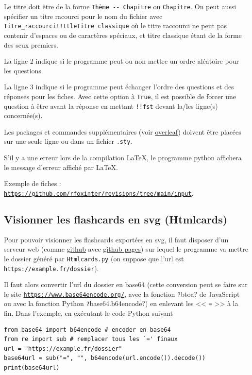 \documentclass[a4paper,12pt]{article}
\begin{document}
Le titre doit être de la forme \texttt{Thème -{}- Chapitre} ou \texttt{Chapitre}.
On peut aussi spécifier un titre racourci pour le nom du fichier avec \texttt{Titre\_raccourci!!ttleTitre classique} où le titre raccourci ne peut pas contenir d'espaces ou de caractères spéciaux, et titre classique étant de la forme des seux premiers.

La ligne 2 indique si le programme peut ou non mettre un ordre aléatoire pour les questions.

La ligne 3 indique si le programme peut échanger l'ordre des questions et des réponses pour les fiches. Avec cette option à \texttt{True}, il est possible de forcer une question à être avant la réponse en mettant \texttt{!!fst} devant la/les ligne(s) concernée(s).

Les packages et commandes supplémentaires (voir \href{https://www.overleaf.com/learn/latex/Commands}{overleaf}) doivent être placées sur une seule ligne ou dans un fichier \texttt{.sty}.

S'il y a une erreur lors de la compilation \LaTeX, le programme python affichera le message d'erreur affiché par \LaTeX.

Exemple de fiches : \href{https://github.com/rfoxinter/revisions/tree/main/input}{\texttt{https://github.com/rfoxinter/revisions/tree/main/input}}.
\subsection{Visionner les flashcards en svg (Htmlcards)}
Pour pouvoir visionner les flashcards exportées en svg, il faut disposer d'un serveur web (comme \href{https://github.com/}{github} avec \href{https://pages.github.com/}{github pages}) sur lequel le programme va mettre le dossier généré par \texttt{Htmlcards.py} (on suppose que l'url est \texttt{https://example.fr/dossier}).

Il faut alors convertir l'url du dossier en base64 (cette conversion peut se faire sur le site \href{https://www.base64encode.org/}{\texttt{https://www.base64encode.org/}}, avec la fonction \texttt?btoa? de JavaScript ou avec la  fonction Python \texttt?base64.b64encode?) en enlevant les << \texttt{=} >> à la fin. Dans l'exemple, en exécutant le code Python suivant
\vspace{-\abovedisplayskip}\begin{verbatim}
from base64 import b64encode # encoder en base64
from re import sub # remplacer tous les `=' finaux
url = "https://example.fr/dossier"
base64url = sub("=", "", b64encode(url.encode()).decode())
print(base64url)
\end{verbatim}
\vspace{-\belowdisplayskip}
\end{document}
